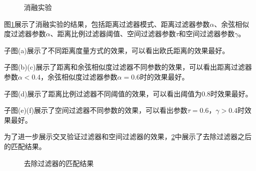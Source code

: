 \begin{figure}[H]
{    }
    \caption{消融实验}
    \label{fig:abl}
\end{figure}

图\ref{fig:abl}展示了消融实验的结果，包括距离过滤器模式、距离过滤器参数$\alpha$、余弦相似度过滤器参数$\alpha$、距离比例过滤器阈值、空间过滤器参数$\tau$和空间过滤器参数$\gamma$。

子图(a)展示了不同距离度量方式的效果，可以看出欧氏距离的效果最好。

子图(b)(c)展示了距离和余弦相似度过滤器不同参数的效果，可以看出距离过滤器参数$\alpha<0.4$，余弦相似度过滤器参数$\alpha=0.6$时的效果最好。

子图(d)展示了距离比例过滤器不同阈值的效果，可以看出阈值为0.8时效果最好。

子图(e)(f)展示了空间过滤器不同参数的效果，可以看出参数$\tau=0.6$，$\gamma>0.4$时效果最好。

为了进一步展示交叉验证过滤器和空间过滤器的效果，\ref{fig:wo}中展示了去除过滤器之后的匹配结果。

\begin{figure}[H]
    \centering
    \caption{去除过滤器的匹配结果}
    \label{fig:wo}
\end{figure}

